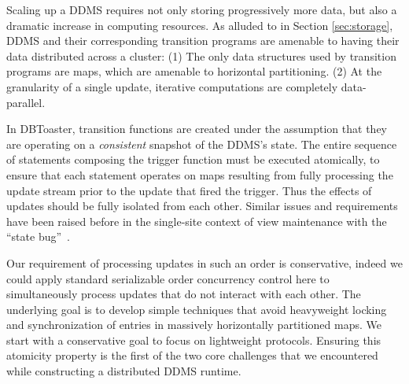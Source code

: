 Scaling up a DDMS requires not only storing progressively more data, but also a
dramatic increase in computing resources.  As alluded to in Section
\ref{sec:storage}, DDMS and their corresponding transition programs are amenable
to having their data distributed across a cluster: (1) The only data structures
used by transition programs are maps, which are amenable to horizontal
partitioning.  (2) At the granularity of a single update, iterative computations
are completely data-parallel. 

In DBToaster, transition functions are created under the assumption that they
are operating on a \textit{consistent} snapshot of the DDMS's state. The entire
sequence of statements composing the trigger function must be executed
atomically, to ensure that each statement operates on maps resulting from fully
processing the update stream prior to the update that fired the trigger.
Thus the effects of updates should be fully isolated from each other.
Similar issues and requirements have been raised before in the single-site
context of view maintenance with the ``state bug''~\cite{colby-sigmod:96}.

Our requirement of processing updates in such an order is conservative, indeed
we could apply standard serializable order concurrency control here to
simultaneously process updates that do not interact with each other. The
underlying goal is to develop simple techniques that avoid heavyweight locking
and synchronization of entries in massively horizontally partitioned maps. 
We start with a conservative goal to focus on lightweight protocols.
Ensuring this atomicity property is the first of the two core challenges that we
encountered while constructing a distributed DDMS runtime.

